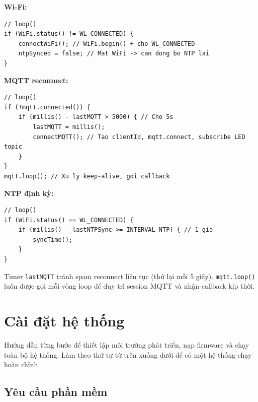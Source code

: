 \documentclass[13pt,a4paper]{article}
\newcommand{\code}[1]{\texttt{#1}}
\begin{document}
\textbf{Wi-Fi:}

\begin{lstlisting}[style=cppcode, caption={Kiểm tra và kết nối lại Wi-Fi}, label={lst:wifi}]
// loop()
if (WiFi.status() != WL_CONNECTED) {
    connectWiFi(); // WiFi.begin() + cho WL_CONNECTED
    ntpSynced = false; // Mat WiFi -> can dong bo NTP lai
}
\end{lstlisting}

\textbf{MQTT reconnect:}

\begin{lstlisting}[style=cppcode, caption={Kiểm tra và kết nối lại MQTT}, label={lst:mqtt}]
// loop()
if (!mqtt.connected()) {
    if (millis() - lastMQTT > 5000) { // Cho 5s
        lastMQTT = millis();
        connectMQTT(); // Tao clientId, mqtt.connect, subscribe LED topic
    }
}
mqtt.loop(); // Xu ly keep-alive, goi callback
\end{lstlisting}

\textbf{NTP định kỳ:}

\begin{lstlisting}[style=cppcode, caption={Đồng bộ NTP định kỳ}, label={lst:ntp}]
// loop()
if (WiFi.status() == WL_CONNECTED) {
    if (millis() - lastNTPSync >= INTERVAL_NTP) { // 1 gio
        syncTime();
    }
}
\end{lstlisting}

Timer \code{lastMQTT} tránh spam reconnect liên tục (thử lại mỗi 5 giây). \code{mqtt.loop()} luôn được gọi mỗi vòng loop để duy trì session MQTT và nhận callback kịp thời.

\section{Cài đặt hệ thống}
\label{sec:cai-dat}

Hướng dẫn từng bước để thiết lập môi trường phát triển, nạp firmware và chạy toàn bộ hệ thống. Làm theo thứ tự từ trên xuống dưới để có một hệ thống chạy hoàn chỉnh.

\subsection{Yêu cầu phần mềm}
\label{sec:yeucau}
\end{document}
